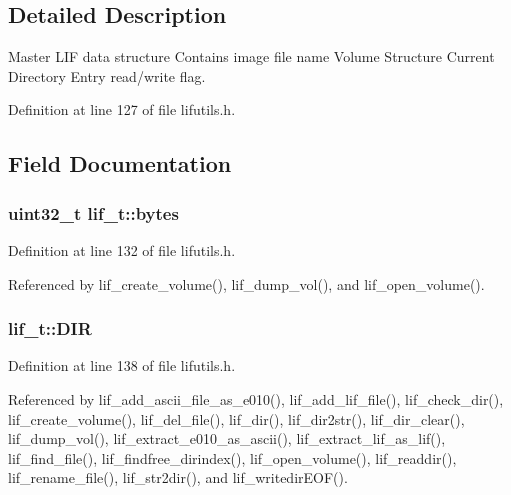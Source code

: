 \subsection{Detailed Description}
Master L\+IF data structure Contains image file name Volume Structure Current Directory Entry read/write flag. 

Definition at line 127 of file lifutils.\+h.



\subsection{Field Documentation}
\subsubsection[{\texorpdfstring{bytes}{bytes}}]{\setlength{\rightskip}{0pt plus 5cm}uint32\+\_\+t lif\+\_\+t\+::bytes}\hypertarget{structlif__t_a46964ae5e810fad047ead39465e9514c}{}\label{structlif__t_a46964ae5e810fad047ead39465e9514c}


Definition at line 132 of file lifutils.\+h.



Referenced by lif\+\_\+create\+\_\+volume(), lif\+\_\+dump\+\_\+vol(), and lif\+\_\+open\+\_\+volume().

\subsubsection[{\texorpdfstring{D\+IR}{DIR}}]{ lif\+\_\+t\+::\+D\+IR}\hypertarget{structlif__t_aefeaa526c04a2b8715b0392feeec52a3}{}\label{structlif__t_aefeaa526c04a2b8715b0392feeec52a3}


Definition at line 138 of file lifutils.\+h.



Referenced by lif\+\_\+add\+\_\+ascii\+\_\+file\+\_\+as\+\_\+e010(), lif\+\_\+add\+\_\+lif\+\_\+file(), lif\+\_\+check\+\_\+dir(), lif\+\_\+create\+\_\+volume(), lif\+\_\+del\+\_\+file(), lif\+\_\+dir(), lif\+\_\+dir2str(), lif\+\_\+dir\+\_\+clear(), lif\+\_\+dump\+\_\+vol(), lif\+\_\+extract\+\_\+e010\+\_\+as\+\_\+ascii(), lif\+\_\+extract\+\_\+lif\+\_\+as\+\_\+lif(), lif\+\_\+find\+\_\+file(), lif\+\_\+findfree\+\_\+dirindex(), lif\+\_\+open\+\_\+volume(), lif\+\_\+readdir(), lif\+\_\+rename\+\_\+file(), lif\+\_\+str2dir(), and lif\+\_\+writedir\+E\+O\+F().

